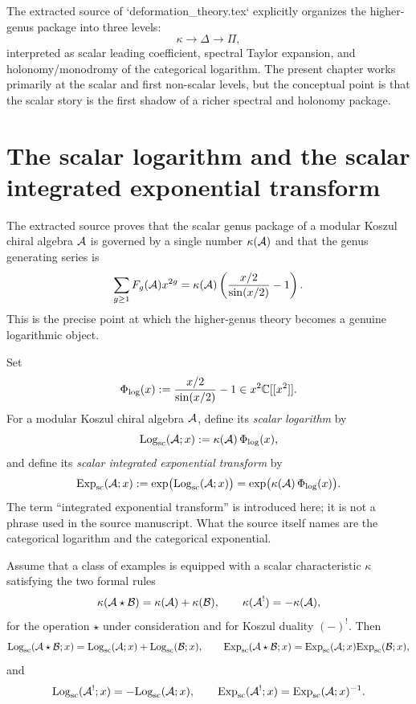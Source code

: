 \begin{summary}
\label{sum:three-levels-logarithm}
The extracted source of `deformation\_theory.tex` explicitly organizes the
higher-genus package into three levels:
\[
\kappa \longrightarrow \Delta \longrightarrow \Pi,
\]
interpreted as scalar leading coefficient, spectral Taylor expansion, and
holonomy/monodromy of the categorical logarithm.  The present chapter works
primarily at the scalar and first non-scalar levels, but the conceptual point is
that the scalar story is the first shadow of a richer spectral and holonomy
package.
\end{summary}

\section{The scalar logarithm and the scalar integrated exponential transform}
\label{sec:scalar-log-exp}

The extracted source proves that the scalar genus package of a modular Koszul
chiral algebra $\mathcal{A}$ is governed by a single number $\kappa(\mathcal{A})$ and that the
genus generating series is
\[
\sum_{g\ge 1}F_g(\mathcal{A})x^{2g}=\kappa(\mathcal{A})\left(\frac{x/2}{\sin(x/2)}-1\right).
\]
This is the precise point at which the higher-genus theory becomes a genuine
logarithmic object.

\begin{definition}
\label{def:scalar-log-exp}
Set
\[
\Phi_{\log}(x):=\frac{x/2}{\sin(x/2)}-1 \in x^2\mathbb{C}[[x^2]].
\]
For a modular Koszul chiral algebra $\mathcal{A}$, define its \emph{scalar logarithm}
by
\[
\mathrm{Log}_{\mathrm{sc}}(\mathcal{A};x):=\kappa(\mathcal{A})\,\Phi_{\log}(x),
\]
and define its \emph{scalar integrated exponential transform} by
\[
\mathrm{Exp}_{\mathrm{sc}}(\mathcal{A};x):=\exp\bigl(\mathrm{Log}_{\mathrm{sc}}(\mathcal{A};x)\bigr)
=\exp\bigl(\kappa(\mathcal{A})\,\Phi_{\log}(x)\bigr).
\]
The term ``integrated exponential transform'' is introduced here; it is not a
phrase used in the source manuscript.  What the source itself names are the
categorical logarithm and the categorical exponential.
\end{definition}

\begin{proposition}
\label{prop:scalar-log-formal-properties}
Assume that a class of examples is equipped with a scalar characteristic
$\kappa$ satisfying the two formal rules
\[
\kappa(\mathcal{A}\star\mathcal{B})=\kappa(\mathcal{A})+\kappa(\mathcal{B}),
\qquad
\kappa(\mathcal{A}^!)=-\kappa(\mathcal{A}),
\]
for the operation $\star$ under consideration and for Koszul duality $(-)^!$.
Then
\[
\mathrm{Log}_{\mathrm{sc}}(\mathcal{A}\star\mathcal{B};x)=\mathrm{Log}_{\mathrm{sc}}(\mathcal{A};x)+\mathrm{Log}_{\mathrm{sc}}(\mathcal{B};x),
\qquad
\mathrm{Exp}_{\mathrm{sc}}(\mathcal{A}\star\mathcal{B};x)=\mathrm{Exp}_{\mathrm{sc}}(\mathcal{A};x)\mathrm{Exp}_{\mathrm{sc}}(\mathcal{B};x),
\]
and
\[
\mathrm{Log}_{\mathrm{sc}}(\mathcal{A}^!;x)=-\mathrm{Log}_{\mathrm{sc}}(\mathcal{A};x),
\qquad
\mathrm{Exp}_{\mathrm{sc}}(\mathcal{A}^!;x)=\mathrm{Exp}_{\mathrm{sc}}(\mathcal{A};x)^{-1}.
\]
\end{proposition}


